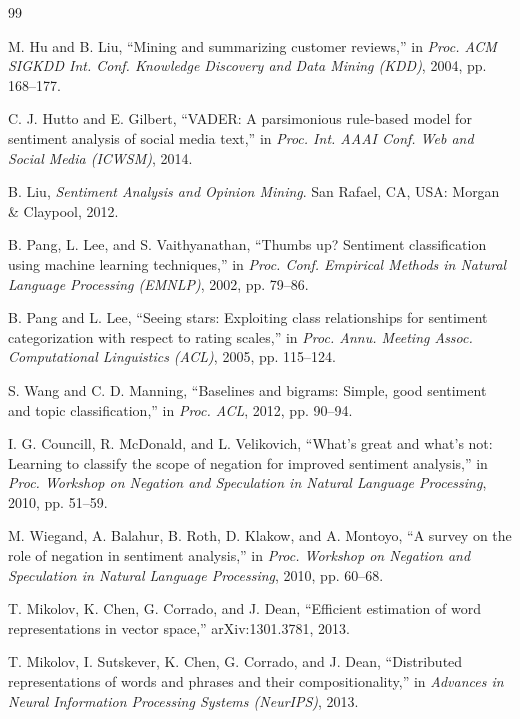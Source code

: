 \documentclass[conference]{IEEEtran}
\begin{document}
\begin{thebibliography}{99}
\footnotesize

 M. Hu and B. Liu, ``Mining and summarizing customer reviews,'' in \emph{Proc. ACM SIGKDD Int. Conf. Knowledge Discovery and Data Mining (KDD)}, 2004, pp. 168--177.

 C. J. Hutto and E. Gilbert, ``VADER: A parsimonious rule-based model for sentiment analysis of social media text,'' in \emph{Proc. Int. AAAI Conf. Web and Social Media (ICWSM)}, 2014.

 B. Liu, \emph{Sentiment Analysis and Opinion Mining}. San Rafael, CA, USA: Morgan \& Claypool, 2012.

 B. Pang, L. Lee, and S. Vaithyanathan, ``Thumbs up? Sentiment classification using machine learning techniques,'' in \emph{Proc. Conf. Empirical Methods in Natural Language Processing (EMNLP)}, 2002, pp. 79--86.

 B. Pang and L. Lee, ``Seeing stars: Exploiting class relationships for sentiment categorization with respect to rating scales,'' in \emph{Proc. Annu. Meeting Assoc. Computational Linguistics (ACL)}, 2005, pp. 115--124.

 S. Wang and C. D. Manning, ``Baselines and bigrams: Simple, good sentiment and topic classification,'' in \emph{Proc. ACL}, 2012, pp. 90--94.

 I. G. Councill, R. McDonald, and L. Velikovich, ``What's great and what's not: Learning to classify the scope of negation for improved sentiment analysis,'' in \emph{Proc. Workshop on Negation and Speculation in Natural Language Processing}, 2010, pp. 51--59.

 M. Wiegand, A. Balahur, B. Roth, D. Klakow, and A. Montoyo, ``A survey on the role of negation in sentiment analysis,'' in \emph{Proc. Workshop on Negation and Speculation in Natural Language Processing}, 2010, pp. 60--68.

 T. Mikolov, K. Chen, G. Corrado, and J. Dean, ``Efficient estimation of word representations in vector space,'' arXiv:1301.3781, 2013.

 T. Mikolov, I. Sutskever, K. Chen, G. Corrado, and J. Dean, ``Distributed representations of words and phrases and their compositionality,'' in \emph{Advances in Neural Information Processing Systems (NeurIPS)}, 2013.


\end{thebibliography}
\end{document}
